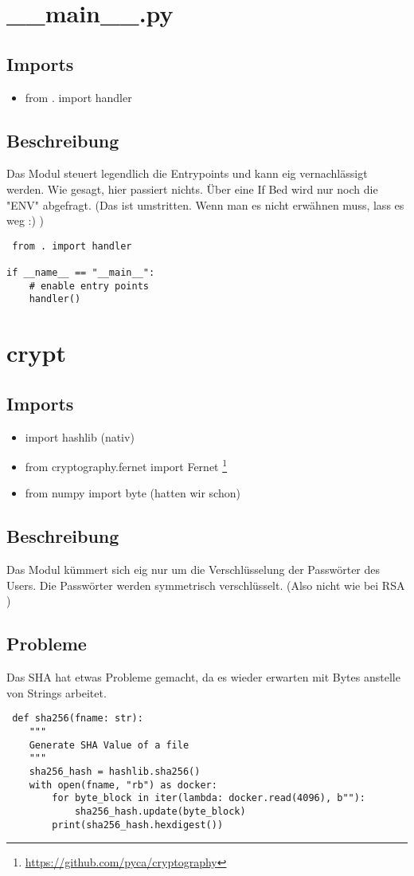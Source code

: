 \documentclass[fleqn,10pt]{olplainarticle}
\begin{document}
\section{\_\_main\_\_.py}
\subsection{Imports}
\begin{itemize}
    \item from . import handler
\end{itemize}
\subsection{Beschreibung}
Das Modul steuert legendlich die Entrypoints und kann eig vernachlässigt werden. Wie gesagt, hier passiert nichts. Über eine If Bed wird nur noch die "ENV" abgefragt. (Das ist umstritten. Wenn man es nicht erwähnen muss, lass es weg :) ) 
\begin{lstlisting}
 from . import handler

if __name__ == "__main__":
    # enable entry points
    handler()
\end{lstlisting}




\section{crypt}
\subsection{Imports}
\begin{itemize}
   \item import hashlib (nativ)
  \item from cryptography.fernet import Fernet \footnote{\url{https://github.com/pyca/cryptography}}
   \item from numpy import byte (hatten wir schon)
\end{itemize}
\subsection{Beschreibung}
Das Modul kümmert sich eig nur um die Verschlüsselung der Passwörter des Users. Die Passwörter werden symmetrisch verschlüsselt. (Also nicht wie bei RSA )
\subsection{Probleme}
Das SHA hat etwas Probleme gemacht, da es wieder erwarten mit Bytes anstelle von Strings arbeitet. 
\begin{lstlisting}
 def sha256(fname: str):
    """
    Generate SHA Value of a file
    """
    sha256_hash = hashlib.sha256()
    with open(fname, "rb") as docker:
        for byte_block in iter(lambda: docker.read(4096), b""):
            sha256_hash.update(byte_block)
        print(sha256_hash.hexdigest())
\end{lstlisting}
\end{document}
